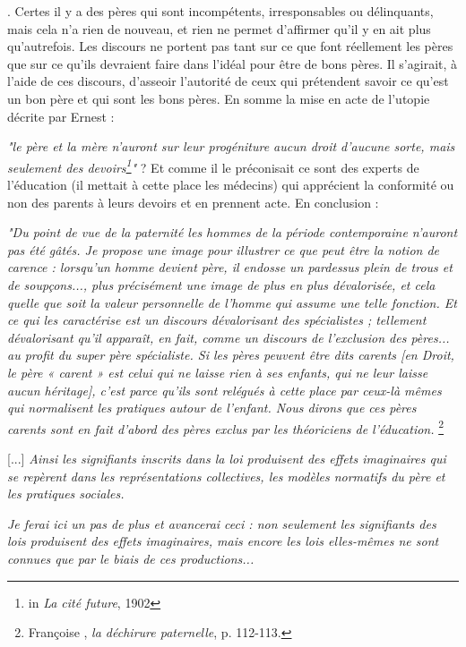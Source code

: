 . Certes il y a des pères qui sont incompétents, irresponsables ou délinquants, mais cela n'a rien de nouveau, et rien ne permet d'affirmer qu'il y en ait plus qu'autrefois. Les discours ne portent pas tant sur ce que font réellement les pères que sur ce qu'ils devraient faire dans l'idéal pour être de bons pères. Il s'agirait, à l'aide de ces discours, d'asseoir l'autorité de ceux qui prétendent savoir ce qu'est un bon père et qui sont les bons pères. En somme la mise en acte de l'utopie décrite par Ernest   : {\emph{"le père et la mère n'auront sur leur progéniture aucun droit d'aucune sorte, mais seulement des devoirs\footnote{in \emph{La cité future}, 1902}"} ? Et comme il le préconisait ce sont des experts de l'éducation (il mettait à cette place les médecins) qui apprécient la conformité ou non des parents à leurs devoirs et en prennent acte. En conclusion :
 
\begin{displayquote} 
\emph{"Du point de vue de la paternité les hommes de la période contemporaine n'auront pas été gâtés. Je propose une image pour illustrer ce que peut être la notion de carence : lorsqu'un homme devient père, il endosse un pardessus plein de trous et de soupçons..., plus précisément une image de plus en plus dévalorisée, et cela quelle que soit la valeur personnelle de l'homme qui assume une telle fonction. Et ce qui les caractérise est un discours dévalorisant des spécialistes ; tellement dévalorisant qu'il apparaît, en fait, comme un discours de l'exclusion des pères... au profit du super père spécialiste. Si les pères peuvent être dits carents \emph{[en Droit, le père « carent » est celui qui ne laisse rien à ses enfants, qui ne leur laisse aucun héritage]}, c'est parce qu'ils sont relégués à cette place par ceux-là mêmes qui normalisent les pratiques autour de l'enfant. Nous dirons que ces pères carents sont en fait d'abord des pères exclus par les théoriciens de l'éducation.}%
\footnote{Françoise , \emph{la déchirure paternelle}, p. 112-113.} 

[...] \emph{Ainsi les signifiants inscrits dans la loi produisent des effets imaginaires qui se repèrent dans les représentations collectives, les modèles normatifs du père et les pratiques sociales.} 

\emph{Je ferai ici un pas de plus et avancerai ceci : non seulement les signifiants des lois produisent des effets imaginaires, mais encore les lois elles-mêmes ne sont connues que par le biais de ces productions...}


\end{displayquote}}
